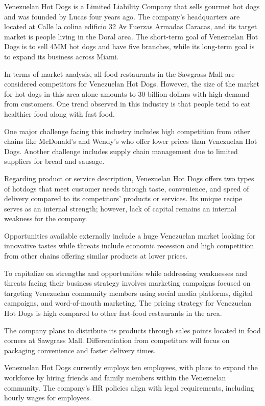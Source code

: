Venezuelan Hot Dogs is a Limited Liability Company that sells gourmet hot dogs and was founded by Lucas four years ago. The company's headquarters are located at Calle la colina edificio 32 Av Fuerzas Armadas Caracas, and its target market is people living in the Doral area. The short-term goal of Venezuelan Hot Dogs is to sell 4MM hot dogs and have five branches, while its long-term goal is to expand its business across Miami.

In terms of market analysis, all food restaurants in the Sawgrass Mall are considered competitors for Venezuelan Hot Dogs. However, the size of the market for hot dogs in this area alone amounts to 30 billion dollars with high demand from customers. One trend observed in this industry is that people tend to eat healthier food along with fast food.

One major challenge facing this industry includes high competition from other chains like McDonald's and Wendy's who offer lower prices than Venezuelan Hot Dogs. Another challenge includes supply chain management due to limited suppliers for bread and sausage.

Regarding product or service description, Venezuelan Hot Dogs offers two types of hotdogs that meet customer needs through taste, convenience, and speed of delivery compared to its competitors' products or services. Its unique recipe serves as an internal strength; however, lack of capital remains an internal weakness for the company.

Opportunities available externally include a huge Venezuelan market looking for innovative tastes while threats include economic recession and high competition from other chains offering similar products at lower prices.

To capitalize on strengths and opportunities while addressing weaknesses and threats facing their business strategy involves marketing campaigns focused on targeting Venezuelan community members using social media platforms, digital campaigns, and word-of-mouth marketing. The pricing strategy for Venezuelan Hot Dogs is high compared to other fast-food restaurants in the area.

The company plans to distribute its products through sales points located in food corners at Sawgrass Mall. Differentiation from competitors will focus on packaging convenience and faster delivery times.

Venezuelan Hot Dogs currently employs ten employees, with plans to expand the workforce by hiring friends and family members within the Venezuelan community. The company's HR policies align with legal requirements, including hourly wages for employees.

